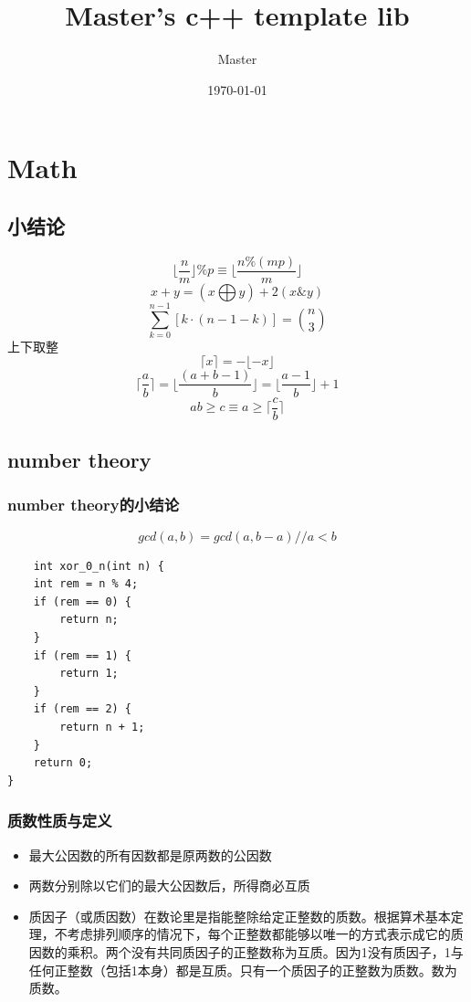 \documentclass[UTF8,twoside]{ctexart}
\title{Master's c++ template lib}
\author{Master}
\date{\today}
\begin{document}
\begin{titlepage}
    \maketitle
\end{titlepage}
\tableofcontents
\section{Math}
\subsection{小结论}
\[
\lfloor \frac{n}{m} \rfloor \% p \equiv \lfloor \frac{n \% (mp)}{m} \rfloor
\]
\[
x+y= ( x\bigoplus y ) + 2 ( x \& y )
\]
\[
\sum_{k=0}^{n-1} \left[ k \cdot (n-1-k) \right] = \binom{n}{3}
\]
上下取整
\[
\lceil x \rceil = - \lfloor - x \rfloor
\]
\[
\lceil \frac{a}{b} \rceil =\lfloor \frac{(a+b-1)}{b} \rfloor = \lfloor \frac{a-1}{b} \rfloor +1
\]
\[
ab\ge c \equiv a\ge \lceil \frac{c}{b} \rceil
\]
\subsection{number theory}
\subsubsection{number theory的小结论}
\[
gcd(a,b)=gcd(a,b-a)//a<b
\]
\begin{lstlisting}
    int xor_0_n(int n) {
    int rem = n % 4;
    if (rem == 0) {
        return n;
    }
    if (rem == 1) {
        return 1;
    }
    if (rem == 2) {
        return n + 1;
    }
    return 0;
}
\end{lstlisting}
\subsubsection{质数性质与定义}
\begin{itemize}
    \item 最大公因数的所有因数都是原两数的公因数
    \item 两数分别除以它们的最大公因数后，所得商必互质
    \item 质因子（或质因数）在数论里是指能整除给定正整数的质数。根据算术基本定理，不考虑排列顺序的情况下，每个正整数都能够以唯一的方式表示成它的质因数的乘积。两个没有共同质因子的正整数称为互质。因为1没有质因子，1与任何正整数（包括1本身）都是互质。只有一个质因子的正整数为质数。数为质数。
\end{itemize}
\end{document}

